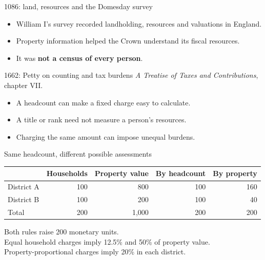 \begin{frame}{1086: land, resources and the Domesday survey}
\begin{itemize}
\item William I's survey recorded landholding, resources and valuations in England.
\item Property information helped the Crown understand its fiscal resources.
\item It was \textbf{not a census of every person}.
\end{itemize}
\end{frame}

\begin{frame}{1662: Petty on counting and tax burdens}
\textit{A Treatise of Taxes and Contributions}, chapter VII.
\begin{itemize}
\item A headcount can make a fixed charge easy to calculate.
\item A title or rank need not measure a person's resources.
\item Charging the same amount can impose unequal burdens.
\end{itemize}
\end{frame}

\begin{frame}{Same headcount, different possible assessments}
\small
\begin{tabular}{lrrrr}\toprule
 & Households & Property value & By headcount & By property\\\midrule
District A & 100 & 800 & 100 & 160\\
District B & 100 & 200 & 100 & 40\\\midrule
Total & 200 & 1,000 & 200 & 200\\\bottomrule
\end{tabular}\par\vspace{3mm}\normalsize
Both rules raise 200 monetary units.\\
Equal household charges imply 12.5\% and 50\% of property value.\\
Property-proportional charges imply 20\% in each district.
\end{frame}

